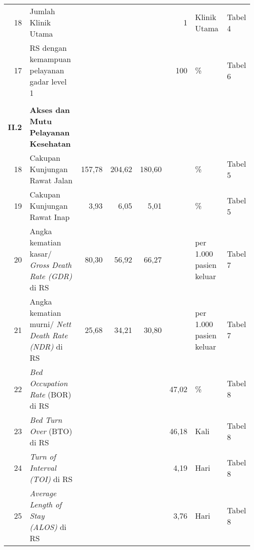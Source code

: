 \begin{small}
\begin{longtable}{rY{12em}rrrrY{5em}Y{5em}}
	 18 & Jumlah Klinik Utama                                                         &        &        &                    &        1 & Klinik Utama                   & Tabel 4  \\
	 17 & RS dengan kemampuan pelayanan gadar level 1                                 &        &        &                    &      100 & \%                             & Tabel 6  \\
	    &                                                                             &        &        &                    &          &                                &          \\ 
    \textbf{II.2} & \textbf{Akses dan Mutu Pelayanan Kesehatan}                       &        &        &                    &          &                                &          \\
	 18 & Cakupan Kunjungan Rawat Jalan                                               & 157,78 & 204,62 &             180,60 &          & \%                             & Tabel 5  \\
	 19 & Cakupan Kunjungan Rawat Inap                                                &   3,93 &   6,05 &               5,01 &          & \%                             & Tabel 5  \\
	 20 & Angka kematian kasar/ \emph{Gross Death Rate (GDR)} di RS                   &  80,30 &  56,92 &              66,27 &          & per 1.000 pasien keluar        & Tabel 7  \\
	 21 & Angka kematian murni/ \emph{Nett Death Rate (NDR)} di RS                    &  25,68 &  34,21 &              30,80 &          & per 1.000 pasien keluar        & Tabel 7  \\
	 22 & \emph{Bed Occupation Rate} (BOR) di RS                                      &        &        &                    &    47,02 & \%                             & Tabel 8  \\
	 23 & \emph{Bed Turn Over} (BTO) di RS                                            &        &        &                    &    46,18 & Kali                           & Tabel 8  \\
	 24 & \emph{Turn of Interval (TOI)} di RS                                         &        &        &                    &     4,19 & Hari                           & Tabel 8  \\
	 25 & \emph{Average Length of Stay (ALOS)} di RS                                  &        &        &                    &     3,76 & Hari                           & Tabel 8  \\

\end{longtable}
\end{small}
